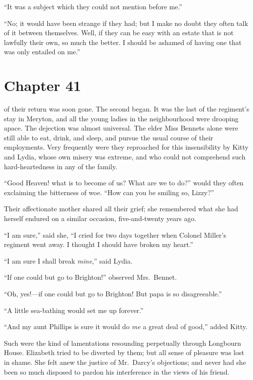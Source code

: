``It was a subject which they could not mention before me.''

``No; it would have been strange if they had; but I make no
doubt they often talk of it between themselves.  Well, if they
can be easy with an estate that is not lawfully their own, so
much the better.  I should be ashamed of having one that was
only entailed on me.''



\chapter{Chapter 41}


 of their return was soon gone.  The second began.
It was the last of the regiment's stay in Meryton, and all the
young ladies in the neighbourhood were drooping apace.  The
dejection was almost universal.  The elder Miss Bennets alone
were still able to eat, drink, and sleep, and pursue the usual
course of their employments.  Very frequently were they
reproached for this insensibility by Kitty and Lydia, whose
own misery was extreme, and who could not comprehend such
hard-heartedness in any of the family.

``Good Heaven! what is to become of us?  What are we to do?''
would they often exclaiming the bitterness of woe.  ``How can
you be smiling so, Lizzy?''

Their affectionate mother shared all their grief; she remembered
what she had herself endured on a similar occasion, five-and-twenty
years ago.

``I am sure,'' said she, ``I cried for two days together when
Colonel Miller's regiment went away.  I thought I should have
broken my heart.''

``I am sure I shall break \emph{mine},'' said Lydia.

``If one could but go to Brighton!'' observed Mrs.\ Bennet.

``Oh, yes!---if one could but go to Brighton!  But papa is so
disagreeable.''

``A little sea-bathing would set me up forever.''

``And my aunt Phillips is sure it would do \emph{me} a great deal of
good,'' added Kitty.

Such were the kind of lamentations resounding perpetually
through Longbourn House.  Elizabeth tried to be diverted by
them; but all sense of pleasure was lost in shame.  She felt anew
the justice of Mr.\ Darcy's objections; and never had she been so
much disposed to pardon his interference in the views of his
friend.


